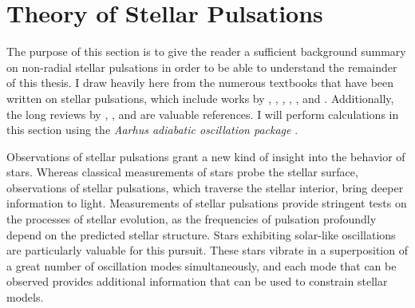 \section{Theory of Stellar Pulsations} 
\label{sec:pulsation}
\begin{shaded}
\noindent The purpose of this section is to give the reader a sufficient background summary on non-radial stellar pulsations in order to be able to understand the remainder of this thesis. 
I draw heavily here from the numerous textbooks that have been written on stellar pulsations, which include works by \cite{1926ics..book.....E}, \cite{1949ptvs.book.....R}, \cite{1979nos..book.....U}, \cite{1980tsp..book.....C}, \cite{2010aste.book.....a}, and \cite{basuchaplin2017}. 
Additionally, the long reviews by \cite{1958HDP....51..353L}, \citet{1993afd..conf..399G}, and \citet{2016lrsp...13....2b} are valuable references.
I will perform calculations in this section using the \emph{Aarhus adiabatic oscillation package} \citep[\textsc{ADIPLS},][]{2008Ap&SS.316..113C}. 
\end{shaded}

Observations of stellar pulsations grant a new kind of insight into the behavior of stars. 
Whereas classical measurements of stars probe the stellar surface, observations of stellar pulsations, which traverse the stellar interior, bring deeper information to light. 
Measurements of stellar pulsations provide stringent tests on the processes of stellar evolution, as the frequencies of pulsation profoundly depend on the predicted stellar structure. 
Stars exhibiting solar-like oscillations are particularly valuable for this pursuit. 
These stars vibrate in a superposition of a great number of oscillation modes simultaneously, and each mode that can be observed provides additional information that can be used to constrain stellar models. 

